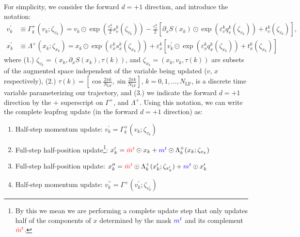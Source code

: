 \documentclass{article} %
\newcommand{\mbart}{\textcolor{red}{\bar{m}^{t}}}
\newcommand{\mt}{\textcolor{blue}{m^{t}}}
\begin{document}
For simplicity, we consider the forward \(d=+1\) direction, and introduce the notation:
%
\begin{align}
   v^{\prime}_{k} &\equiv \Gamma^{+}_{k}(v_{k};\zeta_{v_{k}})
   = v_{k}\odot \exp{\left(\tfrac{\varepsilon^{k}_{v}}{2}s_{v}^{k}(\zeta_{v_{k}})\right)} -
   \tfrac{\varepsilon^{k}_{v}}{2}{\left[\partial_{x}S(x_{k})\odot\exp{\left(\varepsilon^{k}_{v} q_{v}^{k}(\zeta_{v_{k}})\right)}
      +t_{v}^{k}(\zeta_{v_{k}})\right]},\label{eq:new_momentum_update}\\
   x^{\prime}_{k} &\equiv \Lambda^{+}(x_{k};\zeta_{x_{k}})
   = x_{k}\odot\exp(\varepsilon^{k}_{x} s^{k}_{x}(\zeta_{x_{k}}))
   + \varepsilon^{k}_{x}\left[v^{\prime}_{k}\odot\exp(\varepsilon^{k}_{x} q^{k}_{x}(\zeta_{x_{k}}))
         + t^{k}_{x}(\zeta_{x_{k}})\right]\label{eq:new_position_update}
\end{align}
%
where (1.) \(\zeta_{v_{k}} = (x_{k}, \partial_{x}S(x_{k}), \tau(k))\), and \(\zeta_{x_{k}} = (x_{k}, v_{k}, \tau(k))\)
are subsets of the augmented space independent of the variable being updated (\(v\), \(x\) respectively), (2.) \(\tau(k)
= {\left[\cos\tfrac{2\pi k}{N_{\mathrm{LF}}}, \sin\tfrac{2\pi k}{N_{\mathrm{LF}}}\right]}\), \(k = 0, 1, \ldots,
N_{\mathrm{LF}}\), is a discrete time variable parameterizing our trajectory, and (3.) we indicate the forward \(d=+1\)
direction by the \(+\) superscript on \(\Gamma^{+}\), and \(\Lambda^{+}\).
%
Using this notation, we can write the complete leapfrog update (in the forward \(d=+1\) direction) as:
%
\begin{enumerate}
   \item Half-step momentum update:%
      \hspace{29pt}\(%
         v^{\prime}_{k} = \Gamma^{+}_{k}(v_{k};\zeta_{v_{k}})%
   \)
   \item Full-step half-position update\footnote{By this we mean we are performing a complete update step that only
      updates half of the components of \(x\) determined by the mask \(\mt\) and its complement \(\mbart\).}:
      \hspace{17pt} \(%
         x^{\prime}_{k} = \mbart\odot x_{k} + \mt\odot \Lambda^{+}_{k}(x_{k};\zeta_{x_{k}})
   \)
   \item Full-step half-position update:%
      \hspace{20pt} \(%
         x^{\prime\prime}_{k} = \mbart\odot\Lambda^{+}_{k}(x^{\prime}_{k};\zeta_{x^{\prime}_{k}}) + \mt\odot x^{\prime}_{k}
   \)
   \item Half-step momentum update:%
      \hspace{24pt} \(%
         v^{\prime\prime}_{k} = \Gamma^{+}(v^{\prime}_{k}; \zeta_{v^{\prime}_{k}})
   \)
\end{enumerate}
\end{document}
